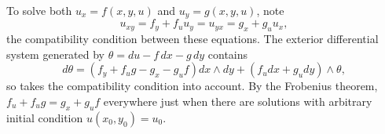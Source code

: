 \begin{example}
To solve both \(u_x=f(x,y,u)\) and \(u_y=g(x,y,u)\), note
\[
u_{xy}=f_y+f_uu_y=u_{yx}=g_x+g_uu_x,
\]
the compatibility condition between these equations.
The exterior differential system generated by \(\theta=du-f\,dx-g\,dy\) contains 
\[
d\theta=(f_y+f_ug-g_x-g_uf)dx\wedge dy+(f_udx+g_udy)\wedge\theta,
\]
so takes the compatibility condition into account.
By the Frobenius theorem, \(f_u+f_ug=g_x+g_uf\) everywhere just when there are solutions with arbitrary initial condition \(u(x_0,y_0)=u_0\).
\end{example}

